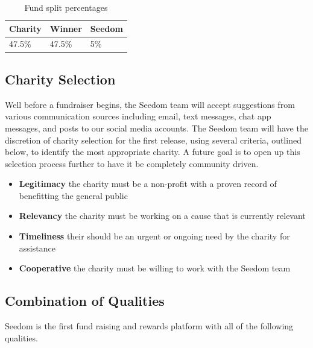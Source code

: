 \documentclass[11pt]{article}
\begin{document}
\begin{table}[H]
\begin{center}
\begin{tabular}{| l | l | l |}
\hline
\textbf{Charity} & \textbf{Winner} & \textbf{Seedom} \\ \hline
47.5\% & 47.5\%  & 5\% \\ \hline
\end{tabular}
\caption{Fund split percentages}
\label{tab:fundSplitPercentages}
\end{center}
\end{table}

\subsection{Charity Selection}

Well before a fundraiser begins, the Seedom team will accept suggestions from various communication sources including email, text messages, chat app messages, and posts to our social media accounts. The Seedom team will have the discretion of charity selection for the first release, using several criteria, outlined below, to identify the most appropriate charity. A future goal is to open up this selection process further to have it be completely community driven.

\begin{itemize}
\item{\textbf{Legitimacy} the charity must be a non-profit with a proven record of benefitting the general public}
\item{\textbf{Relevancy} the charity must be working on a cause that is currently relevant}
\item{\textbf{Timeliness} their should be an urgent or ongoing need by the charity for assistance}
\item{\textbf{Cooperative} the charity must be willing to work with the Seedom team}
\end{itemize}

\subsection{Combination of Qualities}

Seedom is the first fund raising and rewards platform with all of the following qualities.
\end{document}
